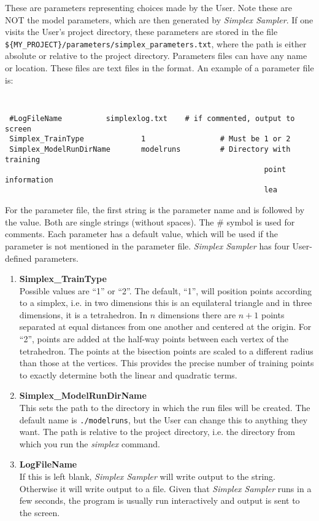 \documentclass[UserManual.tex]{subfiles}
\begin{document}
These are parameters representing choices made by the User. Note these are NOT the model parameters, which are then generated by {\it Simplex Sampler}. If one visits the User's project directory, these parameters are stored in the file   {\tt \$\{MY\_PROJECT\}/parameters/simplex\_parameters.txt}, where the path is either absolute or relative to the project directory.
Parameters files can have any name or location. These files are text files in the format. An example of a parameter file is:
{\tt
\begin{verbatim}
 #LogFileName          simplexlog.txt    # if commented, output to screen
 Simplex_TrainType             1                 # Must be 1 or 2
 Simplex_ModelRunDirName       modelruns         # Directory with training
                                                           point information
                                                           lea
\end{verbatim}
}
For the parameter file, the first string is the parameter name and is followed by the value. Both are single strings (without spaces). The \# symbol is used for comments. Each parameter has a default value, which will be used if the parameter is not mentioned in the parameter file.  {\it Simplex Sampler} has four User-defined parameters.
\begin{enumerate}\itemsep 0pt
    \item {\bf Simplex\_TrainType}\\
Possible values are ``1'' or ``2''. The default, ``1'', will position points according to a simplex, i.e. in two dimensions this is an equilateral triangle and in three dimensions, it is a tetrahedron. In $n$ dimensions there are $n+1$ points separated at equal distances from one another and centered at the origin. For ``2'', points are added at the half-way points between each vertex of the tetrahedron. The points at the bisection points are scaled to a different radius than those at the vertices. This provides the precise number of training points to exactly determine both the linear and quadratic terms.
\item {\bf Simplex\_ModelRunDirName}\\
This sets the path to the directory in which the run files will be created. The default name is {\tt ./modelruns}, but the User can change this to anything they want. The path is relative to the project directory, i.e. the directory from which you run the {\it simplex} command.
\item {\bf LogFileName}\\
If this is left blank, {\it Simplex Sampler} will write output to the string. Otherwise it will write output to a file. Given that {\it Simplex Sampler} runs in a few seconds, the program is usually run interactively and output is sent to the screen.
\end{enumerate}
\end{document}
